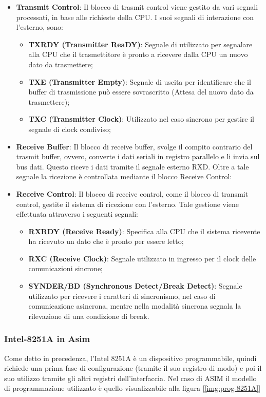 \begin{itemize}
    \item \textbf{Transmit Control}: Il blocco di trasmit control viene gestito da vari segnali processati, in base alle richieste della CPU. I suoi segnali di interazione con l'esterno, sono:
    \begin{itemize}
        \item \textbf{TXRDY (Transmitter ReaDY)}: Segnale di utilizzato per segnalare alla CPU che il trasmettitore è pronto a ricevere dalla CPU un nuovo dato da trasmettere;
        \item \textbf{TXE (Transmitter Empty)}: Segnale di uscita per identificare che il buffer di trasmissione può essere sovrascritto (Attesa del nuovo dato da trasmettere);
        \item \textbf{TXC (Transmitter Clock)}: Utilizzato nel caso sincrono per gestire il segnale di clock condiviso;
    \end{itemize}
    \item \textbf{Receive Buffer}: Il blocco di receive buffer, svolge il compito contrario del trasmit buffer, ovvero, converte i dati seriali in registro parallelo e li invia sul bus dati. Questo riceve i dati tramite il segnale esterno RXD. Oltre a tale segnale la ricezione è controllata mediante il blocco Receive Control:
    \item \textbf{Receive Control}: Il blocco di receive control, come il blocco di transmit control, gestite il sistema di ricezione con l'esterno. Tale gestione viene effettuata attraverso i seguenti segnali:
    \begin{itemize}
        \item \textbf{RXRDY (Receive Ready)}: Specifica alla CPU che il sistema ricevente ha ricevuto un dato che è pronto per essere letto;
        \item \textbf{RXC (Receive Clock)}: Segnale utilizzato in ingresso per il clock delle comunicazioni sincrone;
        \item \textbf{SYNDER/BD (Synchronous Detect/Break Detect)}: Segnale utilizzato per ricevere i caratteri di sincronismo, nel caso di comunicazione asincrona, mentre nella modalità sincrona segnala la rilevazione di una condizione di break.
    \end{itemize}
\end{itemize}

\subsubsection{Intel-8251A in Asim}
Come detto in precedenza, l'Intel 8251A è un dispositivo programmabile, quindi richiede una prima fase di configurazione (tramite il suo registro di modo) e poi il suo utilizzo tramite gli altri registri dell'interfaccia. Nel caso di ASIM il modello di programmazione utilizzato è quello visualizzabile alla figura [\ref{img:prog-8251A}]

